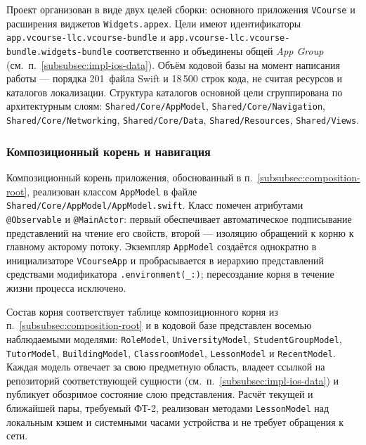 Проект организован в виде двух целей сборки: основного приложения \texttt{VCourse} и расширения виджетов \texttt{Widgets.appex}. Цели имеют идентификаторы \texttt{app.\allowbreak vcourse-llc.\allowbreak vcourse-bundle} и \texttt{app.\allowbreak vcourse-llc.\allowbreak vcourse-bundle.\allowbreak widgets-bundle} соответственно и объединены общей \emph{App Group} (см.~п.~\ref{subsubsec:impl-ios-data}). Объём кодовой базы на момент написания работы --- порядка 201~файла Swift и 18\,500 строк кода, не считая ресурсов и каталогов локализации. Структура каталогов основной цели сгруппирована по архитектурным слоям: \texttt{Shared/Core/AppModel}, \texttt{Shared/Core/Navigation}, \texttt{Shared/Core/Networking}, \texttt{Shared/Core/Data}, \texttt{Shared/Resources}, \texttt{Shared/Views}.

\subsubsection{Композиционный корень и навигация}
\label{subsubsec:impl-ios-app-model}

Композиционный корень приложения, обоснованный в п.~\ref{subsubsec:composition-root}, реализован классом \texttt{AppModel} в файле \texttt{Shared/\allowbreak Core/\allowbreak AppModel/\allowbreak AppModel.swift}. Класс помечен атрибутами \texttt{@Observable} и \texttt{@MainActor}: первый обеспечивает автоматическое подписывание представлений на чтение его свойств, второй --- изоляцию обращений к корню к главному акторому потоку. Экземпляр \texttt{AppModel} создаётся однократно в инициализаторе \texttt{VCourseApp} и пробрасывается в иерархию представлений средствами модификатора \texttt{.environment(\_:)}; пересоздание корня в течение жизни процесса исключено.

Состав корня соответствует таблице композиционного корня из п.~\ref{subsubsec:composition-root} и в кодовой базе представлен восемью наблюдаемыми моделями: \texttt{RoleModel}, \texttt{UniversityModel}, \texttt{StudentGroupModel}, \texttt{TutorModel}, \texttt{BuildingModel}, \texttt{ClassroomModel}, \texttt{LessonModel} и \texttt{RecentModel}. Каждая модель отвечает за свою предметную область, владеет ссылкой на репозиторий соответствующей сущности (см.~п.~\ref{subsubsec:impl-ios-data}) и публикует обозримое состояние слою представления. Расчёт текущей и ближайшей пары, требуемый ФТ-2, реализован методами \texttt{LessonModel} над локальным кэшем и системными часами устройства и не требует обращения к сети.

